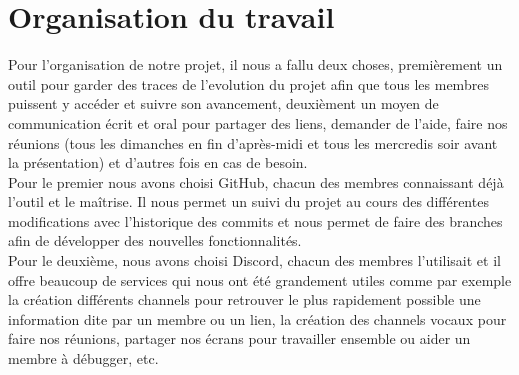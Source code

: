 \documentclass[12pt, french]{article}
\begin{document}
	\section{Organisation du travail}
	Pour l'organisation de notre projet, il nous a fallu deux choses, premièrement un outil pour garder des traces de l'evolution du projet afin que tous les membres puissent y accéder et suivre son avancement, deuxièment un moyen de communication écrit et oral pour partager des liens, demander de l'aide, faire nos réunions (tous les dimanches en fin d'après-midi et tous les mercredis soir avant la présentation) et d'autres fois en cas de besoin. \\
	Pour le premier nous avons choisi GitHub, chacun des membres connaissant déjà l'outil et le maîtrise. Il nous permet un suivi du projet au cours des différentes modifications avec l'historique des commits et nous permet de faire des branches afin de développer des nouvelles fonctionnalités.\\
	Pour le deuxième, nous avons choisi Discord, chacun des membres l'utilisait et il offre beaucoup de services qui nous ont été grandement utiles comme par exemple la création différents channels pour retrouver le plus rapidement possible une information dite par un membre ou un lien, la création des channels vocaux pour faire nos réunions, partager nos écrans pour travailler ensemble ou aider un membre à débugger, etc.
\end{document}
